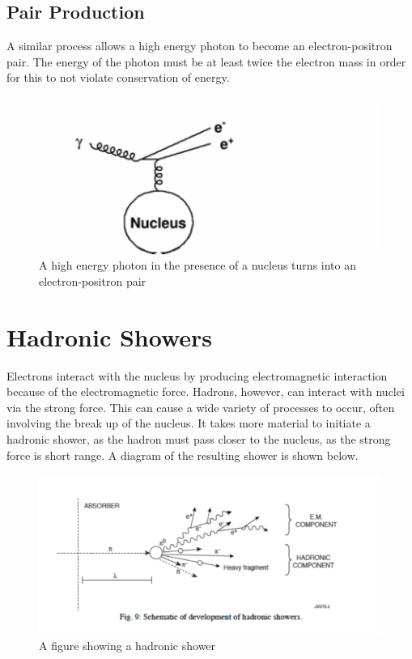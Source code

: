 \;

\subsection{Pair Production}

\noindent
A similar process allows a high energy photon to become an electron-positron pair.  The energy of the photon must be at least twice the electron mass in order for this to not violate conservation of energy.


\;
\;

\begin{figure}[h]
\centering\includegraphics[scale=0.7]{./calorimetry/Pictures/fig3.pdf}
\caption{A high energy photon in the presence of a nucleus turns into an electron-positron pair}
\label{fig:pdgdedx}
\end{figure}

\;

\section{Hadronic Showers}

\noindent
Electrons interact with the nucleus by producing electromagnetic interaction because of the electromagnetic force. Hadrons, however, can interact with nuclei via the strong force. This can cause a wide variety of processes to occur, often involving the break up of the nucleus. It takes more material to initiate a hadronic shower, as the hadron must pass closer to the nucleus, as the strong force is short range. A diagram of the resulting shower is shown below.

\;
\;

\begin{figure}[h]
\centering\includegraphics[scale=0.5]{./calorimetry/Pictures/fig4.pdf}
\caption{A figure showing a hadronic shower}
\label{fig:pdgdedx}
\end{figure}


